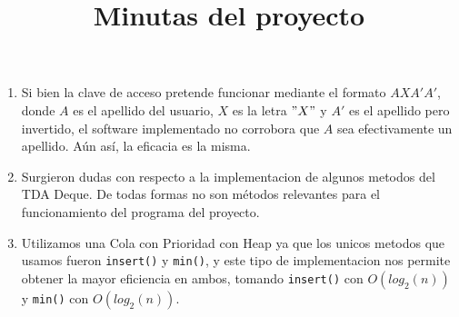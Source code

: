 \documentclass[11pt]{article}
\title{\textbf{Minutas del proyecto}}
\date{}
\begin{document}
\maketitle
\thispagestyle{empty}
\begin{enumerate}
	\item Si bien la clave de acceso pretende funcionar mediante el formato \(AXA'A'\), donde \(A\) es el apellido del usuario, \(X\) es la letra \("X"\) y \(A'\) es el apellido pero invertido, el software implementado no corrobora que \(A\) sea efectivamente un apellido. Aún así, la eficacia es la misma.
	\item Surgieron dudas con respecto a la implementacion de algunos metodos del TDA Deque. De todas formas no son métodos relevantes para el funcionamiento del programa del proyecto.
	\item Utilizamos una Cola con Prioridad con Heap ya que los unicos metodos que usamos fueron \texttt{insert()} y \texttt{min()}, y este tipo de implementacion nos permite obtener la mayor eficiencia en ambos, tomando \texttt{insert()} con \(O(log_2(n))\) y \texttt{min()} con \(O(log_2(n))\).
\end{enumerate}
\end{document}
